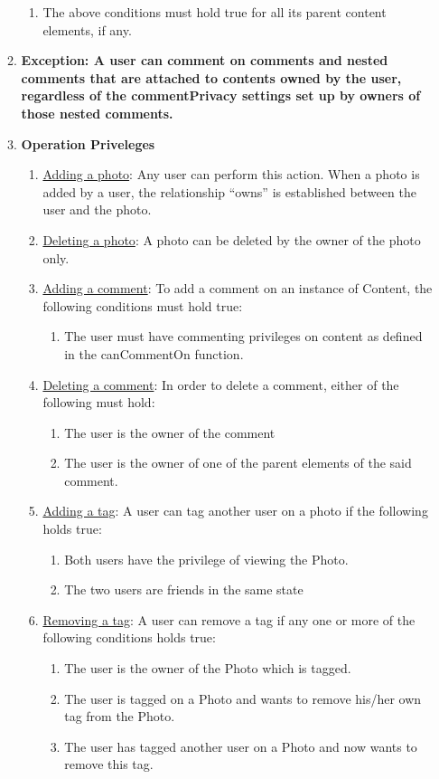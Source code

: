 \documentclass[titlepage]{article}
\begin{document}
\begin{enumerate}
\begin{enumerate}
\begin{enumerate}
	\item The above conditions must hold true for all its parent content elements, if any.
\end{enumerate}
\item\textbf{Exception: A user can comment on comments and nested comments that are attached to contents owned by the user, regardless of the commentPrivacy settings set up by owners of those nested comments.}
\item\textbf{Operation Priveleges}
\begin{enumerate}
	\item \underline{Adding a photo}: Any user can perform this action. When a photo is added by a user, the relationship “owns” is established between the user and the photo.
	\item \underline{Deleting a photo}: A photo can be deleted by the owner of the photo only.
	\item \underline{Adding a comment}: To add a comment on an instance of Content, the following conditions must hold true:
	      \begin{enumerate}
		      \item The user must have commenting privileges on content as defined in the canCommentOn function.
	      \end{enumerate}
	\item \underline{Deleting a comment}: In order to delete a comment, either of the following must hold:
	      \begin{enumerate}
		      \item The user is the owner of the comment
		      \item The user is the owner of one of the parent elements of the said comment.
		            \end {enumerate}
		      \item \underline{Adding a tag}: A user can tag another user on a photo if the following holds true:
		            \begin{enumerate}
			            \item Both users have the privilege of viewing the Photo.
			            \item The two users are friends in the same state
		            \end{enumerate}
		      \item \underline{Removing a tag}: A user can remove a tag if any one or more of the following conditions holds true:
		            \begin{enumerate}
			            \item The user is the owner of the Photo which is tagged.
			            \item The user is tagged on a Photo and wants to remove his/her own tag from the Photo.
			            \item The user has tagged another user on a Photo and now wants to remove this tag.
		            \end{enumerate}
	      \end{enumerate}
	      \end {enumerate}
\end{enumerate}
\end{document}
